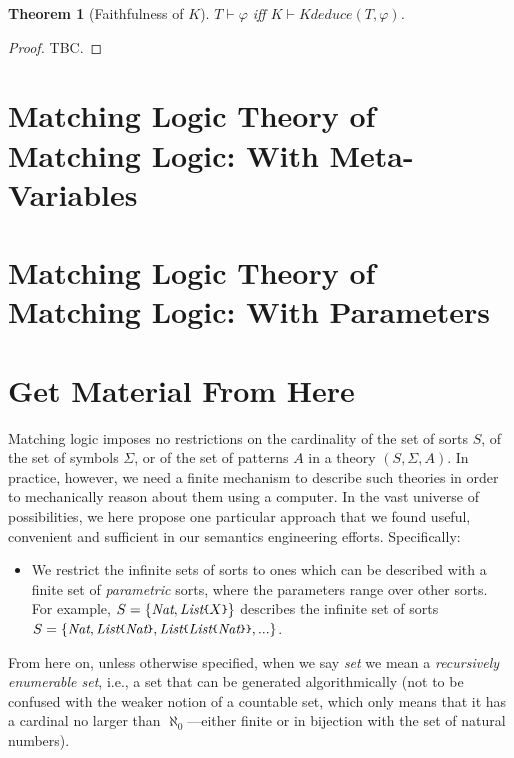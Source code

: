 \documentclass[UTF8,11pt]{article}
\newcounter{thmcounter}
\theoremstyle{plain}
\newtheorem{theorem}[thmcounter]{Theorem}
\theoremstyle{definition}
\theoremstyle{remark}
\newcommand{\Kdeduce}{\mathit{Kdeduce}}
\newcommand{\Nat}{\textit{Nat}}
\newcommand{\List}{\textit{List}}
\newcommand{\parametric}[2]{{#1}\raisebox{.2ex}{\texttt{\footnotesize{\{}}}#2\raisebox{.2ex}{\texttt{\footnotesize{\}}}}}
\begin{document}
\begin{theorem}[Faithfulness of $K$]
	$T \vdash \varphi$ iff $K \vdash \Kdeduce(T, \varphi)$.
\end{theorem}
\begin{proof}
	TBC.
\end{proof}

\section{Matching Logic Theory of Matching Logic: With Meta-Variables}

\section{Matching Logic Theory of Matching Logic: With Parameters}

\section{Get Material From Here}

Matching logic imposes no restrictions on the cardinality of the set of
sorts $S$, of the set of symbols $\Sigma$, or of the set of patterns $A$
in a theory $(S,\Sigma,A)$.
In practice, however, we need a finite mechanism to describe such theories
in order to mechanically reason about them using a computer.
In the vast universe of possibilities, we here propose one particular approach
that we found useful, convenient and sufficient in our semantics engineering
efforts.
Specifically:
\begin{itemize}
\item
We restrict the infinite sets of sorts to ones which can be described with
a finite set of \emph{parametric} sorts, where the parameters range over
other sorts.
For example, $S=\{\Nat,\parametric{\List}{X}\}$ describes the infinite set
of sorts
$S=\{\Nat, \parametric{\List}{\Nat}, \parametric{\List}{\parametric{\List}{\Nat}}, ...\}$.

\end{itemize}

From here on, unless otherwise specified, when we say \emph{set} we mean
a \emph{recursively enumerable set}, i.e., a set that can be generated
algorithmically (not to be confused with the weaker notion of a
countable
set, which only means that it has a cardinal no larger than
$\aleph_0$---either finite or in bijection with the set
of natural numbers).
\end{document}
